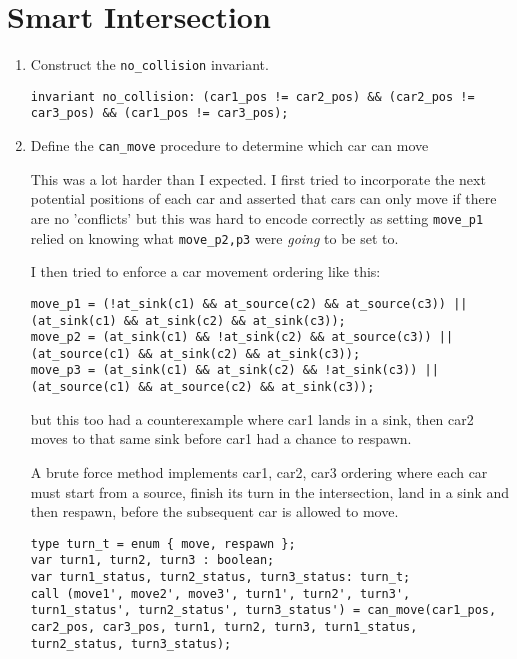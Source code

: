 \section{Smart Intersection}
\begin{enumerate}[label=(\alph*)]
  \item {\color{blue}Construct the \verb|no_collision| invariant.}

    \begin{verbatim}
invariant no_collision: (car1_pos != car2_pos) && (car2_pos != car3_pos) && (car1_pos != car3_pos);
    \end{verbatim}

  \item {\color{blue}Define the \verb|can_move| procedure to determine which car can move}

    This was a lot harder than I expected. I first tried to incorporate the next potential positions of each car and asserted that cars can only move if there are no 'conflicts' but this was hard to encode correctly as setting \verb|move_p1| relied on knowing what \verb|move_p2,p3| were \textit{going} to be set to.

    I then tried to enforce a car movement ordering like this:
    \begin{verbatim}
move_p1 = (!at_sink(c1) && at_source(c2) && at_source(c3)) || (at_sink(c1) && at_sink(c2) && at_sink(c3));
move_p2 = (at_sink(c1) && !at_sink(c2) && at_source(c3)) || (at_source(c1) && at_sink(c2) && at_sink(c3));
move_p3 = (at_sink(c1) && at_sink(c2) && !at_sink(c3)) || (at_source(c1) && at_source(c2) && at_sink(c3));
    \end{verbatim}
    but this too had a counterexample where car1 lands in a sink, then car2 moves to that same sink before car1 had a chance to respawn.

    A brute force method implements car1, car2, car3 ordering where each car must start from a source, finish its turn in the intersection, land in a sink and then respawn, before the subsequent car is allowed to move.

    \begin{verbatim}
type turn_t = enum { move, respawn };
var turn1, turn2, turn3 : boolean;
var turn1_status, turn2_status, turn3_status: turn_t;
call (move1', move2', move3', turn1', turn2', turn3', turn1_status', turn2_status', turn3_status') = can_move(car1_pos, car2_pos, car3_pos, turn1, turn2, turn3, turn1_status, turn2_status, turn3_status);


\end{verbatim}
\end{enumerate}
